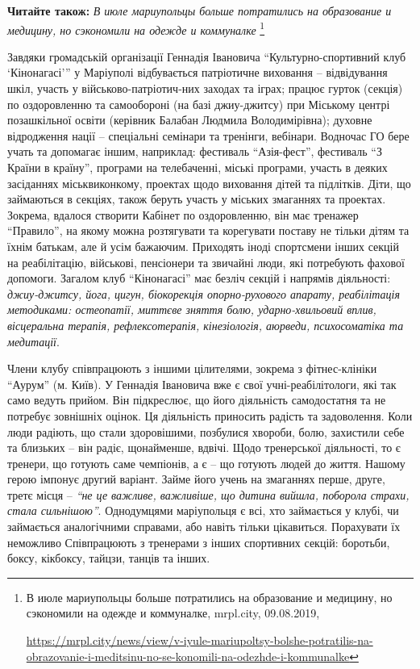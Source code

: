 \textbf{Читайте також:} \emph{В июле мариупольцы больше потратились на образование и медицину, но сэкономили на одежде и коммуналке}%
\footnote{В июле мариупольцы больше потратились на образование и медицину, но сэкономили на одежде и коммуналке, mrpl.city, 09.08.2019, %
\par\url{https://mrpl.city/news/view/v-iyule-mariupoltsy-bolshe-potratilis-na-obrazovanie-i-meditsinu-no-se-konomili-na-odezhde-i-kommunalke}}


Завдяки громадській організації Геннадія Івановича \enquote{Культурно-спортивний клуб
\enquote{Кінонагасі}} у Маріуполі відбувається патріотичне виховання – відвідування
шкіл, участь у військово-патріотич\hyp{}них заходах та іграх; працює гурток (секція)
по оздоровленню та самообороні (на базі джиу-джитсу) при Міському центрі
позашкільної освіти (керівник Балабан Людмила Володимірівна); духовне
відродження нації – спеціальні семінари та тренінги, вебінари. Водночас ГО бере
учать та допомагає іншим, наприклад: фестиваль \enquote{Азія-фест}, фестиваль \enquote{З Країни
в країну}, програми на телебаченні, міські програми, участь в деяких засіданнях
міськвиконкому, проектах щодо виховання дітей та підлітків. Діти, що займаються
в секціях, також беруть участь у міських змаганнях та проектах. Зокрема,
вдалося створити Кабінет по оздоровленню, він має тренажер \enquote{Правило}, на якому
можна розтягувати та корегувати поставу не тільки дітям та їхнім батькам, але й
усім бажаючим. Приходять іноді спортсмени інших секцій на реабілітацію,
військові, пенсіонери та звичайні люди, які потребують фахової допомоги.
Загалом клуб \enquote{Кінонагасі} має безліч секцій і напрямів діяльності: \emph{джиу-джитсу,
йога, цигун, біокорекція опорно-рухового апарату, реабілітація методиками:
остеопатії, миттєве зняття болю, ударно-хвильовий вплив, вісцеральна терапія,
рефлексотерапія, кінезіологія, аюрведи, психосоматіка та медитації}.

Члени клубу співпрацюють з іншими цілителями, зокрема з фітнес-клініки \enquote{Аурум}
(м. Київ). У Геннадія Івановича вже є свої учні-реабілітологи, які так само
ведуть прийом. Він підкреслює, що його діяльність самодостатня та не потребує
зовнішніх оцінок. Ця діяльність приносить радість та задоволення. Коли люди
радіють, що стали здоровішими, позбулися хвороби, болю, захистили себе та
близьких – він радіє, щонайменше, вдвічі. Щодо тренерської діяльності, то є
тренери, що готують саме чемпіонів, а є – що готують людей до життя. Нашому
герою імпонує другий варіант. Займе його учень на змаганнях перше, друге, третє
місця – \emph{\enquote{не це важливе, важливіше, що дитина вийшла, поборола страхи, стала
сильнішою}}. Однодумцями маріупольця є всі, хто займається у клубі, чи
займається аналогічними справами, або навіть тільки цікавиться. Порахувати їх
неможливо Співпрацюють з тренерами з інших спортивних секцій: боротьби, боксу,
кікбоксу, тайцзи, танців та інших.

